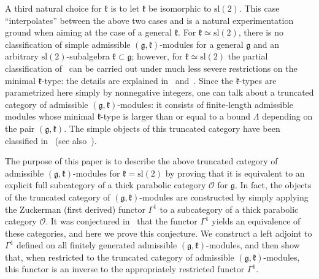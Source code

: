 \documentclass{tglat2e}
\theoremstyle{definition}
\theoremstyle{remark}
\newcommand{\kk}{\mathfrak{k}}
\renewcommand{\gg}{\mathfrak{g}}
\begin{document}
A third natural choice for $\mathfrak{k}$ is to let $\mathfrak{k}$ be isomorphic to $\mathrm{sl}(2)$.  This case ``interpolates'' between the above two cases and is a natural experimentation ground when aiming at the case of a general $\mathfrak{k}$.  For $\mathfrak{k}\simeq \mathrm{sl}(2)$, there is no classification of simple admissible $(\mathfrak{g},\mathfrak{k})$-modules for a general $\mathfrak{g}$ and an arbitrary $\mathrm{sl}(2)$-subalgebra $\mathfrak{k}\subset\mathfrak{g}$; however, for $\kk\simeq\mathrm{sl}(2)$ the partial classification of~\cite{PZ1} can be carried out under much less severe restrictions on the minimal $\mathfrak{k}$-type: the details are explained in~\cite{PZ5} and~\cite{PZ6}.  Since the $\mathfrak{k}$-types are parametrized here simply by nonnegative integers, one can talk about a truncated category of admissible $(\mathfrak{g},\mathfrak{k})$-modules: it consists of finite-length admissible modules whose minimal $\mathfrak{k}$-type is larger than or equal to a bound $\Lambda$ depending on the pair $(\mathfrak{g},\mathfrak{k})$.  The simple objects of this truncated category have been classified in~\cite{PZ5} (see also~\cite{PZ6}).

The purpose of this paper is to describe the above truncated category of admissible $(\mathfrak{g},\mathfrak{k})$-modules for $\mathfrak{k}=\mathrm{sl}(2)$ by proving that it is equivalent to an explicit full subcategory of a thick parabolic category $\mathcal{O}$ for $\mathfrak{g}$.  In fact, the objects of the truncated category of $(\mathfrak{g},\mathfrak{k})$-modules are constructed by simply applying the Zuckerman (first derived) functor $\Gamma^1$ to a subcategory of a thick parabolic category $\mathcal{O}$.  It was conjectured in~\cite{PZ5} that the functor $\Gamma^1$ yields an equivalence of these categories, and here we prove this conjecture.  We construct a left adjoint to $\Gamma^1$ defined on all finitely generated admissible $(\mathfrak{g},\mathfrak{k})$-modules, and 
then show that, when restricted to the truncated category of admissible $(\gg,\kk)$-modules, this functor is an inverse to the appropriately restricted functor $\Gamma^1$.
\end{document}
